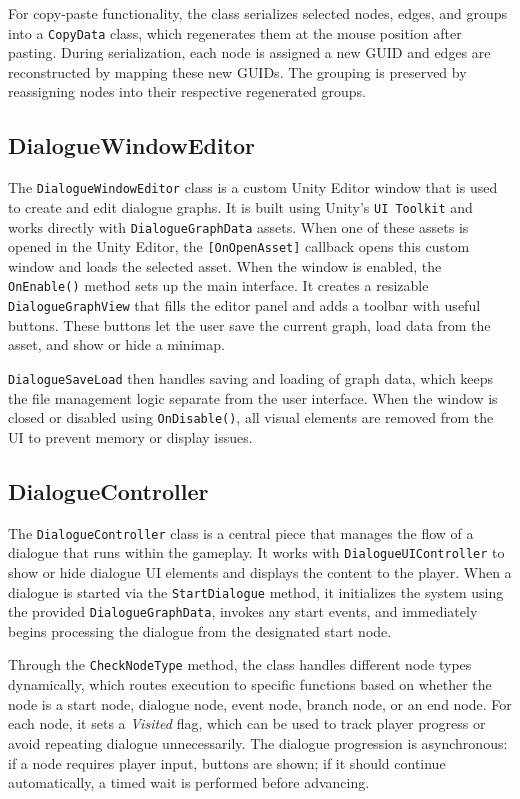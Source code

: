 For copy-paste functionality, the class serializes selected nodes, edges, and groups into a \verb|CopyData| class, which regenerates them at the mouse position after pasting. During serialization, each node is assigned a new GUID and edges are reconstructed by mapping these new GUIDs. The grouping is preserved by reassigning nodes into their respective regenerated groups.

 
\subsection{DialogueWindowEditor}
\label{devlog:DialogueWindowEditor}
The \verb|DialogueWindowEditor| class is a custom Unity Editor window that is used to create and edit dialogue graphs. It is built using Unity’s \verb|UI Toolkit| and works directly with \verb|DialogueGraphData| assets. When one of these assets is opened in the Unity Editor, the \verb|[OnOpenAsset]| callback opens this custom window and loads the selected asset. When the window is enabled, the \verb|OnEnable()| method sets up the main interface. It creates a resizable \verb|DialogueGraphView| that fills the editor panel and adds a toolbar with useful buttons. These buttons let the user save the current graph, load data from the asset, and show or hide a minimap.

\verb|DialogueSaveLoad| then handles saving and loading of graph data, which keeps the file management logic separate from the user interface. When the window is closed or disabled using \verb|OnDisable()|, all visual elements are removed from the UI to prevent memory or display issues.


\subsection{DialogueController}
\label{devlog:DialogueController}
The \verb|DialogueController| class is a central piece that manages the flow of a dialogue that runs within the gameplay. It works with \verb|DialogueUIController| to show or hide dialogue UI elements and displays the content to the player. When a dialogue is started via the \verb|StartDialogue| method, it initializes the system using the provided \verb|DialogueGraphData|, invokes any start events, and immediately begins processing the dialogue from the designated start node.

Through the \verb|CheckNodeType| method, the class handles different node types dynamically, which routes execution to specific functions based on whether the node is a start node, dialogue node, event node, branch node, or an end node. For each node, it sets a \textit{Visited} flag, which can be used to track player progress or avoid repeating dialogue unnecessarily. The dialogue progression is asynchronous: if a node requires player input, buttons are shown; if it should continue automatically, a timed wait is performed before advancing.

